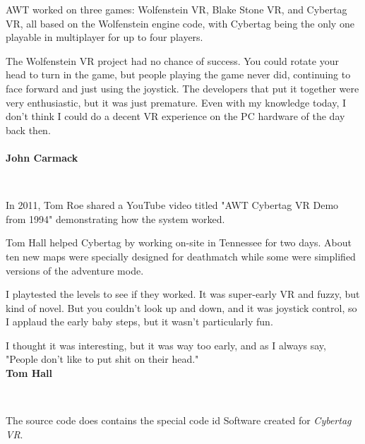  AWT worked on three games: Wolfenstein VR, Blake Stone VR, and Cybertag VR, all based on the Wolfenstein engine code, with Cybertag being the only one playable in multiplayer for up to four players. \\
\par
\begin{fancyquotes}
The Wolfenstein VR project had no chance of success.  You could rotate your head to turn in the game, but people playing the game never did, continuing to face forward and just using the joystick.  The developers that put it together were very enthusiastic, but it was just premature.  Even with my knowledge today, I don't think I could do a decent VR experience on the PC hardware of the day back then.\\
\bigskip \\
\textbf{John Carmack}
 \end{fancyquotes}\\
\par
\vspace{-5pt}
In 2011, Tom Roe shared a YouTube video titled "AWT Cybertag VR Demo from 1994" demonstrating how the system worked. 


\begin{figure}[H]
  \centering
 
\end{figure}

\begin{figure}[H]
  \centering
{}
\end{figure}

\begin{figure}[H]
  \centering
{}
\end{figure}

\begin{figure}[H]
  \centering
{}
 
\end{figure}
\par
Tom Hall helped Cybertag by working on-site in Tennessee for two days. About ten new maps were specially designed for deathmatch while some were simplified versions of the adventure mode.\\
\par
\begin{fancyquotes}
I playtested the levels to see if they worked. It was super-early VR and fuzzy, but kind of novel. But you couldn't look up and down, and it was joystick control, so I applaud the early baby steps, but it wasn't particularly fun.\\
\par

I thought it was interesting, but it was way too early, and as I always say, "People don't like to put shit on their head."
\bigskip \\
\textbf{Tom Hall}
 \end{fancyquotes}\\
\par
The source code does contains the special code id Software created for \textit{Cybertag VR}.\\
\par
{}

